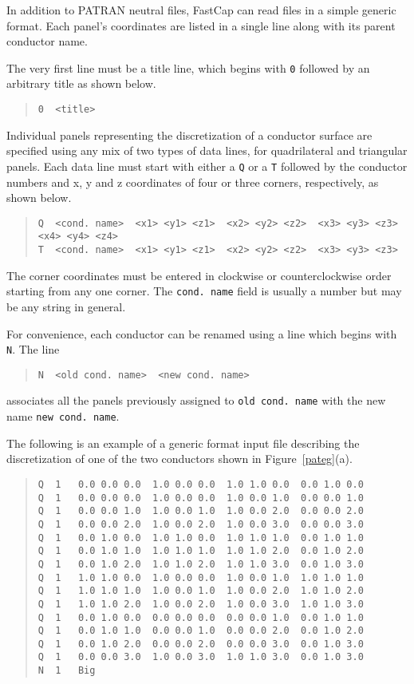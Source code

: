 In addition to PATRAN neutral files, FastCap can read files in
a simple generic format.
Each panel's coordinates are listed in a single line along with its
parent conductor name.

The very first line must be a title line, which begins with {\tt 0}
followed by an arbitrary title as shown below.
\begin{quote}
\begin{verbatim}
0  <title>
\end{verbatim}
\end{quote}  
Individual panels representing the discretization of a conductor
surface are specified using any mix of two types of data lines, 
for quadrilateral and triangular panels.  Each data line must start
with either a {\tt Q} or a {\tt T} followed by the conductor numbers
and x, y and z coordinates of four or three corners, respectively, as
shown below.
\begin{quote}\footnotesize
\begin{verbatim}
Q  <cond. name>  <x1> <y1> <z1>  <x2> <y2> <z2>  <x3> <y3> <z3>  <x4> <y4> <z4>  
T  <cond. name>  <x1> <y1> <z1>  <x2> <y2> <z2>  <x3> <y3> <z3> 
\end{verbatim}
\end{quote}  
The corner coordinates must be entered in clockwise or
counterclockwise order starting from any one corner.  The \verb#cond. name#
field is usually a number but may be any string in general.

For convenience, each conductor can be renamed using a line
which begins with {\tt N}. The line
\begin{quote}
\begin{verbatim}
N  <old cond. name>  <new cond. name>
\end{verbatim}
\end{quote}  
associates all the panels previously assigned to \verb#old cond. name#
with the new name \verb#new cond. name#. 

The following is an example of a generic format input file describing the
discretization of one of the two conductors shown in Figure~\ref{pateg}(a).
\begin{quote}
\begin{verbatim}
Q  1   0.0 0.0 0.0  1.0 0.0 0.0  1.0 1.0 0.0  0.0 1.0 0.0
Q  1   0.0 0.0 0.0  1.0 0.0 0.0  1.0 0.0 1.0  0.0 0.0 1.0
Q  1   0.0 0.0 1.0  1.0 0.0 1.0  1.0 0.0 2.0  0.0 0.0 2.0
Q  1   0.0 0.0 2.0  1.0 0.0 2.0  1.0 0.0 3.0  0.0 0.0 3.0
Q  1   0.0 1.0 0.0  1.0 1.0 0.0  1.0 1.0 1.0  0.0 1.0 1.0
Q  1   0.0 1.0 1.0  1.0 1.0 1.0  1.0 1.0 2.0  0.0 1.0 2.0
Q  1   0.0 1.0 2.0  1.0 1.0 2.0  1.0 1.0 3.0  0.0 1.0 3.0
Q  1   1.0 1.0 0.0  1.0 0.0 0.0  1.0 0.0 1.0  1.0 1.0 1.0
Q  1   1.0 1.0 1.0  1.0 0.0 1.0  1.0 0.0 2.0  1.0 1.0 2.0
Q  1   1.0 1.0 2.0  1.0 0.0 2.0  1.0 0.0 3.0  1.0 1.0 3.0
Q  1   0.0 1.0 0.0  0.0 0.0 0.0  0.0 0.0 1.0  0.0 1.0 1.0
Q  1   0.0 1.0 1.0  0.0 0.0 1.0  0.0 0.0 2.0  0.0 1.0 2.0
Q  1   0.0 1.0 2.0  0.0 0.0 2.0  0.0 0.0 3.0  0.0 1.0 3.0
Q  1   0.0 0.0 3.0  1.0 0.0 3.0  1.0 1.0 3.0  0.0 1.0 3.0
N  1   Big
\end{verbatim}
\end{quote}



%










